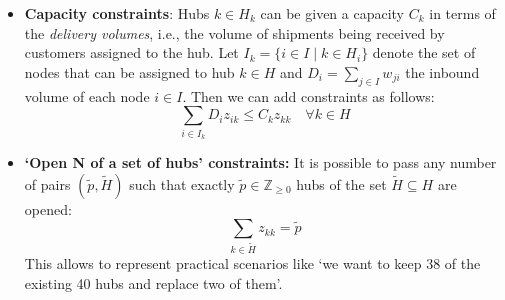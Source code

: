 \documentclass{article}
\begin{document}
\begin{itemize}
    \item \textbf{Capacity constraints}: Hubs \(k \in H_k\) can be given a capacity \(C_k\) in terms of the \textit{delivery volumes}, i.e., the volume of shipments being received by customers assigned to the hub.
    Let \(I_k = \{i \in I \mid k \in H_i\}\) denote the set of nodes that can be assigned to hub \(k \in H\) and \(D_i = \sum_{j \in I} w_{ji}\) the inbound volume of each node \(i \in I\).
    Then we can add constraints as follows:
    \begin{equation}
        \sum_{i \in I_k} D_i z_{ik} \leq C_k z_{kk} \quad \forall k \in H
    \end{equation}
    \item \textbf{`Open N of a set of hubs' constraints:} It is possible to pass any number of pairs \((\tilde{p},\tilde{H})\) such that exactly \(\tilde{p} \in \mathbb{Z}_{\geq 0}\) hubs of the set \(\tilde{H} \subseteq H\) are opened:
    \begin{equation}
        \sum_{k \in \tilde{H}} z_{kk} = \tilde{p}
    \end{equation}
    This allows to represent practical scenarios like `we want to keep 38 of the existing 40 hubs and replace two of them'.
\end{itemize}
\end{document}
